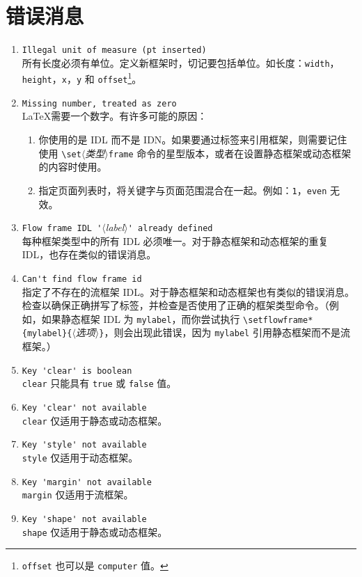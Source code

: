 \documentclass[a4paper]{book}%
\newcommand{\meta}[1]{\textnormal{\ensuremath{\langle}\makebox[0pt][l]{}\emph{#1}\makebox[0pt][l]{}\ensuremath{\rangle}}}
\newcommand{\cmd}[1]{\texttt{#1}}
\begin{document}
\section{错误消息}%
\begin{enumerate}
    \item \verb|Illegal unit of measure (pt inserted)|\\ 所有长度必须有单位。定义新框架时，切记要包括单位。如长度：\cmd{width}，\cmd{height}，\cmd{x}，\cmd{y} 和 \cmd{offset}\footnote{\cmd{offset} 也可以是 \cmd{computer} 值。}。
    \item \verb|Missing number, treated as zero|\\ \LaTeX 需要一个数字。有许多可能的原因：
    \begin{enumerate}
        \item 你使用的是 IDL 而不是 IDN。如果要通过标签来引用框架，则需要记住使用 \verb|\set|\meta{类型}\verb|frame| 命令的星型版本，或者在设置静态框架或动态框架的内容时使用。
        \item 指定页面列表时，将关键字与页面范围混合在一起。例如：\cmd{1}，\cmd{even} 无效。
    \end{enumerate}
    \item \verb|Flow frame IDL '|\meta{label}\verb|' already defined|\\ 每种框架类型中的所有 IDL 必须唯一。对于静态框架和动态框架的重复 IDL，也存在类似的错误消息。
    \item \verb|Can't find flow frame id|\\ 指定了不存在的流框架 IDL。对于静态框架和动态框架也有类似的错误消息。检查以确保正确拼写了标签，并检查是否使用了正确的框架类型命令。（例如，如果静态框架 IDL 为 \cmd{mylabel}，而你尝试执行 \verb|\setflowframe*{mylabel}{|\meta{选项}\verb|}|，则会出现此错误，因为 \verb|mylabel| 引用静态框架而不是流框架。）
    \item \verb|Key 'clear' is boolean|\\ \cmd{clear} 只能具有 \cmd{true} 或 \cmd{false} 值。
    \item \verb|Key 'clear' not available|\\ \cmd{clear} 仅适用于静态或动态框架。
    \item \verb|Key 'style' not available|\\ \cmd{style} 仅适用于动态框架。
    \item \verb|Key 'margin' not available|\\ \cmd{margin} 仅适用于流框架。
    \item \verb|Key 'shape' not available|\\ \cmd{shape} 仅适用于静态或动态框架。

\end{enumerate}
\end{document}
